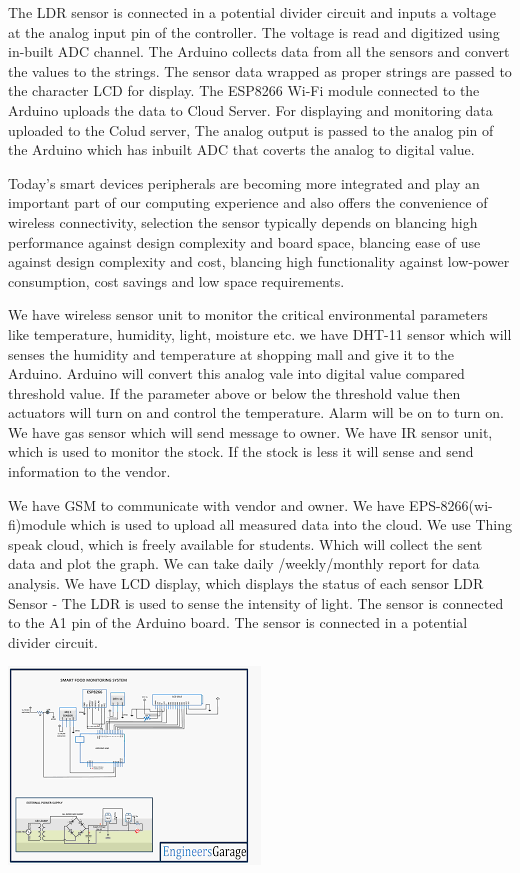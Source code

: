 \documentclass{report}
\begin{document}
\begin{multicols}{1}
    The LDR sensor is connected in a potential divider circuit and inputs a voltage at the analog input pin of the controller. The voltage is read and digitized using in-built ADC channel. The Arduino collects data from all the sensors and convert the values to the strings. The sensor data wrapped as proper strings are passed to the character LCD for display. The ESP8266 Wi-Fi module connected to the Arduino uploads the data to Cloud Server. For displaying and monitoring data uploaded to the Colud server, The analog output is passed to the analog pin of the Arduino which has inbuilt ADC that coverts the analog to digital value. 
    
    Today’s smart devices peripherals are becoming more integrated and play an important part of our computing experience and also offers the convenience of wireless connectivity, selection the sensor typically depends on blancing high performance against design complexity and board space, blancing ease of use against design complexity and cost, blancing high functionality against low-power consumption, cost savings and low space requirements.
    
    We have wireless sensor unit to monitor the critical environmental parameters like temperature, humidity, light, moisture etc. we have DHT-11 sensor which will senses the humidity and temperature at shopping mall and give it to the Arduino. Arduino will convert this analog vale into digital value compared threshold value. If the parameter above or below the threshold value then actuators will turn on and control the temperature. Alarm will be on to turn on. We have gas sensor which will send message to owner. We have IR sensor unit, which is used to monitor the stock. If the stock is less it will sense and send information to the vendor.

    We have GSM to communicate with vendor and owner. We have EPS-8266(wi-fi)module which is used to upload all measured data into the cloud. We use Thing speak cloud, which is freely available for students. Which will collect the sent data and plot the graph. We can take daily /weekly/monthly report for data analysis. We have LCD display, which displays the status of each sensor LDR Sensor - The LDR is used to sense the intensity of light. The sensor is connected to the A1 pin of the Arduino board. The sensor is connected in a potential divider circuit.
    
    \includegraphics{images/Arduino.png }

\end{multicols}
\end{document}
